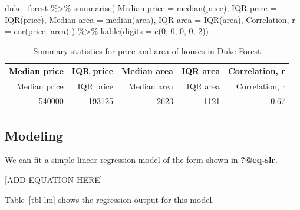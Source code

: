 \documentclass[
  letterpaper,
  DIV=11,
  numbers=noendperiod]{scrartcl}
\newenvironment{Shaded}{\begin{snugshade}}{\end{snugshade}}
\newcommand{\AttributeTok}[1]{\textcolor[rgb]{0.40,0.45,0.13}{#1}}
\newcommand{\DecValTok}[1]{\textcolor[rgb]{0.68,0.00,0.00}{#1}}
\newcommand{\FunctionTok}[1]{\textcolor[rgb]{0.28,0.35,0.67}{#1}}
\newcommand{\NormalTok}[1]{\textcolor[rgb]{0.00,0.23,0.31}{#1}}
\newcommand{\OtherTok}[1]{\textcolor[rgb]{0.00,0.23,0.31}{#1}}
\newcommand{\SpecialCharTok}[1]{\textcolor[rgb]{0.37,0.37,0.37}{#1}}
\newcommand{\StringTok}[1]{\textcolor[rgb]{0.13,0.47,0.30}{#1}}
\begin{document}
\begin{Shaded}
\begin{Highlighting}[]
\NormalTok{duke\_forest }\SpecialCharTok{\%\textgreater{}\%}
  \FunctionTok{summarise}\NormalTok{(}
    \StringTok{\textasciigrave{}}\AttributeTok{Median price}\StringTok{\textasciigrave{}} \OtherTok{=} \FunctionTok{median}\NormalTok{(price),}
    \StringTok{\textasciigrave{}}\AttributeTok{IQR price}\StringTok{\textasciigrave{}} \OtherTok{=} \FunctionTok{IQR}\NormalTok{(price),}
    \StringTok{\textasciigrave{}}\AttributeTok{Median area}\StringTok{\textasciigrave{}} \OtherTok{=} \FunctionTok{median}\NormalTok{(area),}
    \StringTok{\textasciigrave{}}\AttributeTok{IQR area}\StringTok{\textasciigrave{}} \OtherTok{=} \FunctionTok{IQR}\NormalTok{(area),}
    \StringTok{\textasciigrave{}}\AttributeTok{Correlation, r}\StringTok{\textasciigrave{}} \OtherTok{=} \FunctionTok{cor}\NormalTok{(price, area)}
\NormalTok{    ) }\SpecialCharTok{\%\textgreater{}\%}
  \FunctionTok{kable}\NormalTok{(}\AttributeTok{digits =} \FunctionTok{c}\NormalTok{(}\DecValTok{0}\NormalTok{, }\DecValTok{0}\NormalTok{, }\DecValTok{0}\NormalTok{, }\DecValTok{0}\NormalTok{, }\DecValTok{2}\NormalTok{))}
\end{Highlighting}
\end{Shaded}

\hypertarget{tbl-stats}{}
\begin{longtable}[]{@{}rrrrr@{}}
\caption{\label{tbl-stats}Summary statistics for price and area of
houses in Duke Forest}\tabularnewline
\toprule()
Median price & IQR price & Median area & IQR area & Correlation, r \\
\midrule()
\endfirsthead
\toprule()
Median price & IQR price & Median area & IQR area & Correlation, r \\
\midrule()
\endhead
540000 & 193125 & 2623 & 1121 & 0.67 \\
\bottomrule()
\end{longtable}

\hypertarget{sec-model}{%
\subsection{Modeling}\label{sec-model}}

We can fit a simple linear regression model of the form shown in
\textbf{?@eq-slr}.

{[}ADD EQUATION HERE{]}

Table~\ref{tbl-lm} shows the regression output for this model.
\end{document}
